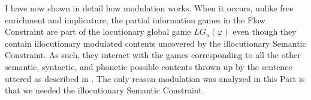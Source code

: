 I have now shown in detail how modulation works. When it occurs, unlike free enrichment and implicature, the partial information games in the Flow Constraint are part of the locutionary global game $LG_u(\varphi)$ even though they contain illocutionary modulated contents uncovered by the illocutionary Semantic Constraint. As such, they interact with the games corresponding to all the other semantic, syntactic, and phonetic possible contents thrown up by the sentence uttered as described in . The only reason modulation was analyzed in this Part is that we needed the illocutionary Semantic Constraint.


%
%
%
%

